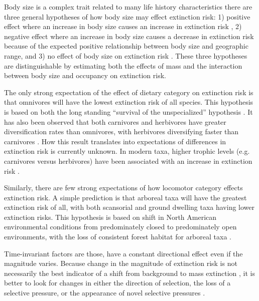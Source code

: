 \documentclass[12pt]{article}
\begin{document}
Body size is a complex trait related to many life history characteristics there are three general hypotheses of how body size may effect extinction risk: 1) positive effect where an increase in body size causes an increase in extinction risk \cite{Liow2008,Liow2009}, 2) negative effect where an increase in body size causes a decrease in extinction risk because of the expected positive relationship between body size and geographic range, and 3) no effect of body size on extinction risk \cite{Tomiya2013}. These three hypotheses are distinguishable by estimating both the effects of mass and the interaction between body size and occupancy on extinction risk.

The only strong expectation of the effect of dietary category on extinction risk is that omnivores will have the lowest extinction risk of all species. This hypothesis is based on both the long standing ``survival of the unspecialized'' hypothesis \cite{Liow2004a,Simpson1944}. It has also been observed that both carnivores and herbivores have greater diversification rates than omnivores, with herbivores diversifying faster than carnivores \cite{Price2012}. How this result translates into expectations of differences in extinction risk is currently unknown. In modern taxa, higher trophic levels (e.g. carnivores versus herbivores) have been associated with an increase in extinction risk \cite{Liow2009,Purvis2000a}. 

Similarly, there are few strong expectations of how locomotor category effects extinction risk. A simple prediction is that arboreal taxa will have the greatest extinction risk of all, with both scansorial and ground dwelling taxa having lower extinction risks. This hypothesis is based on shift in North American environmental conditions from predominately closed to predominately open environments, with the loss of consistent forest habitat for arboreal taxa \cite{Blois2009,Janis1993a}. 

Time-invariant factors are those, have a constant directional effect even if the magnitude varies. Because change in the magnitude of extinction risk is not necessarily the best indicator of a shift from background to mass extinction \cite{Wang2003}, it is better to look for changes in either the direction of selection, the loss of a selective pressure, or the appearance of novel selective pressures \cite{Jablonski1986}.
\end{document}
